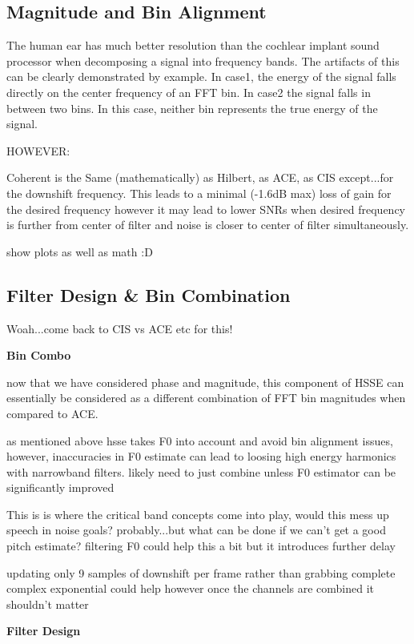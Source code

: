 \documentclass [11pt, proquest] {uwthesis}[2015/03/03]
\begin{document}
\subsection{Magnitude and Bin Alignment}

The human ear has much better resolution than the cochlear implant sound processor when decomposing a signal into frequency bands.  The artifacts of this can be clearly demonstrated by example.  In case1, the energy of the signal falls directly on the center frequency of an FFT bin.  In case2 the signal falls in between two bins.  In this case, neither bin represents the true energy of the signal.

HOWEVER:

Coherent is the Same (mathematically) as Hilbert, as ACE, as CIS except...for the downshift frequency.  This leads to a minimal (-1.6dB max) loss of gain for the desired frequency however it may lead to lower SNRs when desired frequency is further from center of filter and noise is closer to center of filter simultaneously.

show plots as well as math :D

\subsection{Filter Design \& Bin Combination}

Woah...come back to CIS vs ACE etc for this!

\textbf{Bin Combo}

now that we have considered phase and magnitude, this component of HSSE can essentially be considered as a different combination of FFT bin magnitudes when compared to ACE.

as mentioned above hsse takes F0 into account and avoid bin alignment issues, however, inaccuracies in F0 estimate can lead to loosing high energy harmonics with narrowband filters.  likely need to just combine unless F0 estimator can be significantly improved

This is is where the critical band concepts come into play, would this mess up speech in noise goals? probably...but what can be done if we can't get a good pitch estimate?  filtering F0 could help this a bit but it introduces further delay

updating only 9 samples of downshift per frame rather than grabbing complete complex exponential could help however once the channels are combined it shouldn't matter

\textbf{Filter Design}
\end{document}
